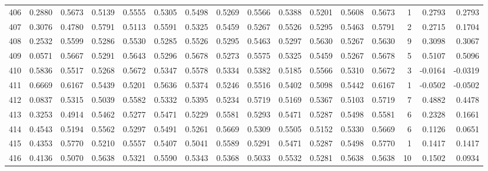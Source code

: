 \begin{tabular}{lrrrrrrrrrrrrrrr}
406 &      0.2880 &  0.5673 &  0.5139 &  0.5555 &  0.5305 &  0.5498 &  0.5269 &  0.5566 &  0.5388 &  0.5201 &   0.5608 &     0.5673 &      1 &                    0.2793 &                     0.2793 \\
407 &      0.3076 &  0.4780 &  0.5791 &  0.5113 &  0.5591 &  0.5325 &  0.5459 &  0.5267 &  0.5526 &  0.5295 &   0.5463 &     0.5791 &      2 &                    0.2715 &                     0.1704 \\
408 &      0.2532 &  0.5599 &  0.5286 &  0.5530 &  0.5285 &  0.5526 &  0.5295 &  0.5463 &  0.5297 &  0.5630 &   0.5267 &     0.5630 &      9 &                    0.3098 &                     0.3067 \\
409 &      0.0571 &  0.5667 &  0.5291 &  0.5643 &  0.5296 &  0.5678 &  0.5273 &  0.5575 &  0.5325 &  0.5459 &   0.5267 &     0.5678 &      5 &                    0.5107 &                     0.5096 \\
410 &      0.5836 &  0.5517 &  0.5268 &  0.5672 &  0.5347 &  0.5578 &  0.5334 &  0.5382 &  0.5185 &  0.5566 &   0.5310 &     0.5672 &      3 &                   -0.0164 &                    -0.0319 \\
411 &      0.6669 &  0.6167 &  0.5439 &  0.5201 &  0.5636 &  0.5374 &  0.5246 &  0.5516 &  0.5402 &  0.5098 &   0.5442 &     0.6167 &      1 &                   -0.0502 &                    -0.0502 \\
412 &      0.0837 &  0.5315 &  0.5039 &  0.5582 &  0.5332 &  0.5395 &  0.5234 &  0.5719 &  0.5169 &  0.5367 &   0.5103 &     0.5719 &      7 &                    0.4882 &                     0.4478 \\
413 &      0.3253 &  0.4914 &  0.5462 &  0.5277 &  0.5471 &  0.5229 &  0.5581 &  0.5293 &  0.5471 &  0.5287 &   0.5498 &     0.5581 &      6 &                    0.2328 &                     0.1661 \\
414 &      0.4543 &  0.5194 &  0.5562 &  0.5297 &  0.5491 &  0.5261 &  0.5669 &  0.5309 &  0.5505 &  0.5152 &   0.5330 &     0.5669 &      6 &                    0.1126 &                     0.0651 \\
415 &      0.4353 &  0.5770 &  0.5210 &  0.5557 &  0.5407 &  0.5041 &  0.5589 &  0.5291 &  0.5471 &  0.5287 &   0.5498 &     0.5770 &      1 &                    0.1417 &                     0.1417 \\
416 &      0.4136 &  0.5070 &  0.5638 &  0.5321 &  0.5590 &  0.5343 &  0.5368 &  0.5033 &  0.5532 &  0.5281 &   0.5638 &     0.5638 &     10 &                    0.1502 &                     0.0934 \\

\end{tabular}
